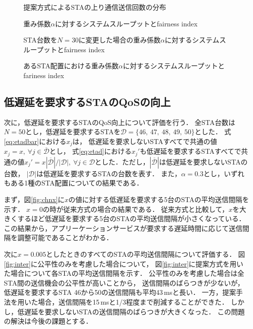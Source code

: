 \documentclass[technicalreport]{ieicej}
\begin{document}
	\begin{figure}[t]
		\centering
		\caption{提案方式によるSTAの上り通信送信回数の分布}
		\label{fig:fair}
	\end{figure}

	\begin{figure}[t]
		\centering
		\caption{重み係数$\alpha$に対するシステムスループットとfairness index}
		\label{fig:thr_fair}
	\end{figure}

	\begin{figure}[t]
		\centering
			\caption{STA台数を$N=30$に変更した場合の重み係数$\alpha$に対するシステムスループットとfairness index}
			\label{fig:chgnum}

			\caption{あるSTA配置における重み係数$\alpha$に対するシステムスループットとfariness index}
			\label{fig:chgtopology}
	\end{figure}

	\subsection{低遅延を要求するSTAのQoSの向上}
	次に，低遅延を要求するSTAのQoS向上について評価を行う．
	全STA台数は$N=50$とし，低遅延を要求するSTAを${\mathcal D}=\{46,\ 47,\ 48,\ 49,\ 50\}$とした．
	式\eqref{eq:etadbar}における$x_j$は，
	低遅延を要求しないSTAすべてで共通の値$x_j=x,\ \forall j\in {\overline {\mathcal D}}$とし，
	式\eqref{eq:etad}における$x_j'$も低遅延を要求するSTAすべてで共通の値$x_j'=x|{\overline {\mathcal D}}|/|{\mathcal D}|,\ \forall j \in {\mathcal D}$とした．ただし，$|{\overline {\mathcal D}}|$は低遅延を要求しないSTAの台数，
	$|{\mathcal D}|$は低遅延を要求するSTAの台数を表す．
	また，$\alpha=0.3$とし，いずれもある1種のSTA配置についての結果である．
	\par
	まず，図\ref{fig:chnx}に$x$の値に対する低遅延を要求する5台のSTAの平均送信間隔を示す．
	$x=0$の時が従来方式の場合の結果である．
	従来方式と比較して，$x$を大きくするほど低遅延を要求する5台のSTAの平均送信間隔が小さくなっている．
	この結果から，アプリーケーションサービスが要求する遅延時間に応じて送信間隔を調整可能であることがわかる．
	\par
	次に$x=0.005$としたときのすべてのSTAの平均送信間隔について評価する．
	図\ref{fig:inter}に公平性のみを考慮した場合について，
	図\ref{fig:inter}に提案方式を用いた場合について各STAの平均送信間隔を示す．
	公平性のみを考慮した場合は全STA間の送信機会の公平性が高いことから，
	送信間隔のばらつきが少ないが，低遅延を要求するSTA 46から50の送信間隔も平均43\,msと長い．
	一方，提案手法を用いた場合，送信間隔を15\,msと1/3程度まで削減することができた．
	しかし，低遅延を要求しないSTAの送信間隔のばらつきが大きくなった．
	この問題の解決は今後の課題とする．
\end{document}
